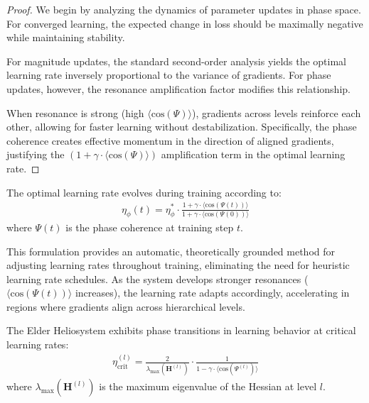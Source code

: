 \begin{proof}
We begin by analyzing the dynamics of parameter updates in phase space. For converged learning, the expected change in loss should be maximally negative while maintaining stability.

For magnitude updates, the standard second-order analysis yields the optimal learning rate inversely proportional to the variance of gradients. For phase updates, however, the resonance amplification factor modifies this relationship.

When resonance is strong (high $\langle\text{cos}(\Psi)\rangle$), gradients across levels reinforce each other, allowing for faster learning without destabilization. Specifically, the phase coherence creates effective momentum in the direction of aligned gradients, justifying the $(1 + \gamma \cdot \langle\text{cos}(\Psi)\rangle)$ amplification term in the optimal learning rate.
\end{proof}

\begin{corollary}
The optimal learning rate evolves during training according to:
\begin{align}
\eta_{\phi}(t) = \eta_{\phi}^* \cdot \frac{1 + \gamma \cdot \langle\text{cos}(\Psi(t))\rangle}{1 + \gamma \cdot \langle\text{cos}(\Psi(0))\rangle}
\end{align}
where $\Psi(t)$ is the phase coherence at training step $t$.
\end{corollary}

This formulation provides an automatic, theoretically grounded method for adjusting learning rates throughout training, eliminating the need for heuristic learning rate schedules. As the system develops stronger resonances ($\langle\text{cos}(\Psi(t))\rangle$ increases), the learning rate adapts accordingly, accelerating in regions where gradients align across hierarchical levels.

\begin{proposition}
The Elder Heliosystem exhibits phase transitions in learning behavior at critical learning rates:
\begin{align}
\eta_{\text{crit}}^{(l)} = \frac{2}{\lambda_{\max}(\mathbf{H}^{(l)})} \cdot \frac{1}{1 - \gamma \cdot \langle\text{cos}(\Psi^{(l)})\rangle}
\end{align}
where $\lambda_{\max}(\mathbf{H}^{(l)})$ is the maximum eigenvalue of the Hessian at level $l$.
\end{proposition}

